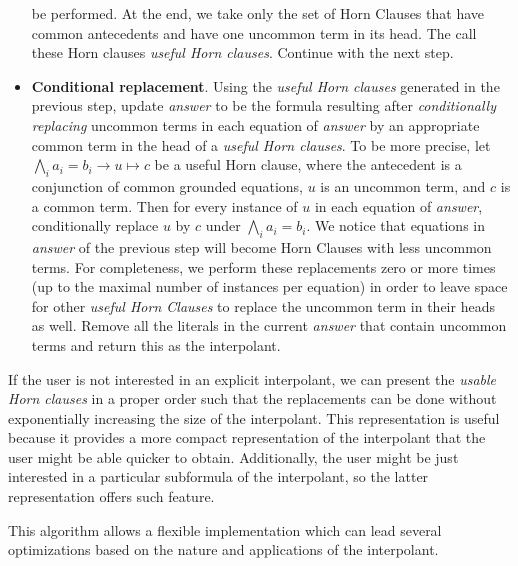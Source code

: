 \begin{itemize}
  be performed. At the end, we take only the
  set of Horn Clauses that have common antecedents 
  and have one uncommon term in its head. The call these
  Horn clauses \emph{useful Horn clauses}. Continue with the next step.
\item \textbf{Conditional replacement}. Using the \emph{useful Horn clauses} 
  generated in the previous
  step, update \emph{answer} to be the formula resulting 
  after \emph{conditionally replacing}
  uncommon terms in each equation of \emph{answer} by an 
  appropriate common term in the head of
  a \emph{useful Horn clauses}.
  To be more precise, let $\bigwedge_i a_i = b_i \rightarrow u \mapsto c$ 
  be a useful Horn clause,
  where the antecedent is a conjunction of common grounded equations, 
  $u$ is an uncommon term,
  and $c$ is a common term.
  Then for every instance of $u$ in each equation of \emph{answer}, conditionally replace $u$
  by $c$ under $\bigwedge_i a_i = b_i$.
  We notice that equations in \emph{answer}  of the previous step will become Horn Clauses with
  less uncommon terms. For completeness, we perform these replacements zero or more times
  (up to the maximal number of instances per equation) in order to leave space for other
  \emph{useful Horn Clauses} to replace the uncommon term in their heads as well.
  Remove all the literals in the current \emph{answer} that contain 
  uncommon terms and return this as the interpolant.
\end{itemize}

If the user is not interested in an explicit interpolant, 
we can present the \emph{usable Horn
  clauses} in a proper order such that the replacements 
  can be done without exponentially increasing
the size of the interpolant. This representation 
is useful because it provides a more compact
representation of the interpolant that the user 
might be able quicker to obtain.
Additionally, the user might be just 
interested in a particular subformula of 
the interpolant, so the
latter representation offers such feature.

This algorithm allows a flexible implementation 
which can lead several optimizations
based on the nature and applications of the 
interpolant.

